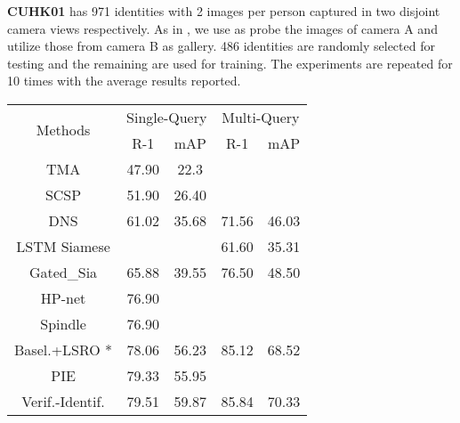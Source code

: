 \documentclass[10pt,letterpaper,twocolumn,10pt,letterpaper,twocolumn]{article}
\providecommand{\tabularnewline}{\\}
\begin{document}
\noindent \noindent \textbf{CUHK01} \cite{cuhk01}  has 971 identities with 2
images per person captured in two disjoint camera views respectively. As in \cite{cuhk01},
we use as probe the images of camera A and utilize those from camera
B as gallery. 486 identities are randomly selected for testing and
the remaining are used for training. The experiments are repeated
for 10 times with the average results reported.

\begin{table}[t]
\centering{}\begin{tabular}{@{\extracolsep{\fill}}c||cc|cc}
\hline 
\multirow{2}{*}{{\small{}Methods}} & \multicolumn{2}{c|}{{\small{}{}{}Single-Query}} & \multicolumn{2}{c}{{\small{}{}{}Multi-Query}}\tabularnewline
\cline{2-5} 
 & {\small{}{}{}{}R-1}  & {\small{}{}{}{}mAP}  & {\small{}{}{}{}R-1}  & {\small{}{}{}{}mAP }\tabularnewline
\hline 
{\small{}{}TMA \cite{martinel2016eccv}}  & {\small{}{}{}{}47.90}  & {\small{}{}{}{}22.3}  & {\small{}{}{}{}\textendash{}}  & {\small{}{}{}{}\textendash{} }\tabularnewline
{\small{}{}{}{}SCSP \cite{chen2016cvpr}}  & {\small{}{}{}{}51.90}  & {\small{}{}{}{}26.40}  & {\small{}{}{}{}\textendash{}}  & {\small{}{}{}{}\textendash{} }\tabularnewline
{\small{}{}{}{}DNS \cite{null_space_cvpr2016}}  & {\small{}{}{}{}61.02}  & {\small{}{}{}{}35.68}  & {\small{}{}{}{}71.56}  & {\small{}{}{}{}46.03}\tabularnewline
{\small{}{}{}{}LSTM Siamese \cite{lstm2016eccv}}  & {\small{}{}{}{}\textendash{}}  & {\small{}{}{}{}\textendash{}}  & {\small{}{}{}{}61.60}  & {\small{}{}{}{}35.31}\tabularnewline
{\small{}{}{}{}Gated\_Sia \cite{gated_siamese_eccv2016}}  & {\small{}{}{}{}65.88}  & {\small{}{}{}{}39.55}  & {\small{}{}{}{}76.50}  & {\small{}{}{}{}48.50 }\tabularnewline
{\small{}{}{}{}HP-net \cite{liu2017hydraplus}}  & {\small{}{}{}{}76.90}  & {\small{}{}{}{}\textendash{}}  & {\small{}{}{}{}\textendash{}}  & {\small{}{}{}{}\textendash{}}\tabularnewline
{\small{}{}{}{}Spindle \cite{zhao2017spindle}}  & {\small{}{}{}{}76.90}  & {\small{}{}{}{}\textendash{}}  & {\small{}{}{}{}\textendash{}}  & {\small{}{}{}{}\textendash{}}\tabularnewline
{\small{}{}{}Basel.+LSRO \cite{zheng2017unlabeled}{*}}  & {\small{}{}{}{}78.06}  & {\small{}{}{}56.23}  & {\small{}{}{}85.12}  & {\small{}{}{}68.52}\tabularnewline
{\small{}{}{}{}PIE \cite{zheng2017pose}}  & {\small{}{}{}{}79.33}  & {\small{}{}{}{}55.95}  & {\small{}{}{}{}\textendash{}}  & {\small{}{}{}{}\textendash{} }\tabularnewline
{\small{}{}{}{}Verif.-Identif. \cite{verif}}  & {\small{}{}{}{}79.51}  & {\small{}{}{}{}59.87}  & {\small{}{}{}{}85.84}  & {\small{}{}{}{}70.33 }\tabularnewline

\end{tabular}
\end{table}
\end{document}
